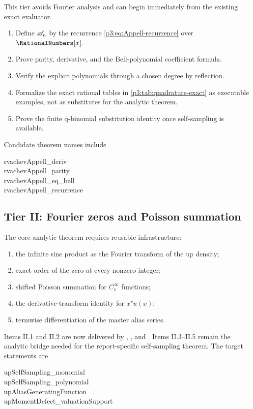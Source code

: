 \documentclass[11pt,oneside]{article}
\numberwithin{equation}{section}
\theoremstyle{definition}
\theoremstyle{remark}
\begin{document}
This tier avoids Fourier analysis and can begin immediately from the existing exact evaluator.
\begin{enumerate}[label=\textbf{I.\arabic*}]
\item Define $\mathscr A_n$ by the recurrence \eqref{p3:eq:Appell-recurrence} over $\RationalNumbers[x]$.
\item Prove parity, derivative, and the Bell-polynomial coefficient formula.
\item Verify the explicit polynomials through a chosen degree by reflection.
\item Formalize the exact rational tables in \cref{p3:tab:quadrature-exact} as executable examples, not as substitutes for the analytic theorem.
\item Prove the finite q-binomial substitution identity once self-sampling is available.
\end{enumerate}
Candidate theorem names include
\begin{center}
\begin{minipage}{0.86\textwidth}\small\ttfamily
rvachevAppell\_deriv\\
rvachevAppell\_parity\\
rvachevAppell\_eq\_bell\\
rvachevAppell\_recurrence
\end{minipage}
\end{center}

\subsection{Tier II: Fourier zeros and Poisson summation}

The core analytic theorem requires reusable infrastructure:
\begin{enumerate}[label=\textbf{II.\arabic*}]
\item the infinite sinc product as the Fourier transform of the up density;
\item exact order of the zero at every nonzero integer;
\item shifted Poisson summation for $C_c^\infty$ functions;
\item the derivative-transform identity for $x^ru(x)$;
\item termwise differentiation of the master alias series.
\end{enumerate}
Items II.1 and II.2 are now delivered by ,
, and
.  Items II.3--II.5 remain the analytic
bridge needed for the report-specific self-sampling theorem.
The target statements are
\begin{center}
\begin{minipage}{0.86\textwidth}\small\ttfamily
upSelfSampling\_monomial\\
upSelfSampling\_polynomial\\
upAliasGeneratingFunction\\
upMomentDefect\_valuationSupport
\end{minipage}
\end{center}
\end{document}
